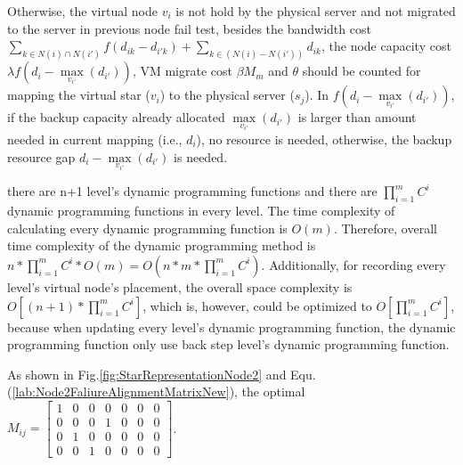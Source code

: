 Otherwise, the virtual node $v_i$ is not hold by the physical server and not migrated to the server in previous node fail test, besides the bandwidth cost ${\sum\limits_{k \in N(i) \cap N(i')} {f({d_{ik}} - {d_{i'k}})}  + \sum\limits_{k \in \left( {N(i) - N(i')} \right)} {{d_{ik}}} }$, the node capacity cost ${\lambda f({d_i} - \mathop {\max }\limits_{{v_{i'}}} \left( {{d_{i'}}} \right))}$, VM migrate cost ${\beta {M_m}}$ and $\theta$ should be counted for mapping the virtual star ($v_i$) to the physical server ($s_j$). In ${f({d_i} - \mathop {\max }\limits_{{v_{i'}}} \left( {{d_{i'}}} \right))}$, if the backup capacity already allocated ${\mathop {\max }\limits_{{v_{i'}}} \left( {{d_{i'}}} \right)}$ is larger than amount needed  in current mapping (i.e., $d_i$), no resource is needed, otherwise, the backup resource gap ${{d_i} - \mathop {\max }\limits_{{v_{i'}}} \left( {{d_{i'}}} \right)}$ is needed.

there are n+1 level's dynamic programming functions and there are $\prod_{i=1}^{m}C^i$ dynamic programming functions in every level. The time complexity of calculating every dynamic programming function is $O(m)$. Therefore, overall time complexity of the dynamic programming method is $n*\prod_{i=1}^{m}C^i*O(m)=O(n*m*\prod_{i=1}^{m}C^i)$. Additionally, for recording every level's virtual node's placement, the overall space complexity is $O[(n+1)*\prod_{i=1}^{m}C^i]$, which is, however, could be optimized to $O[\prod_{i=1}^{m}C^i]$, because when updating every level's dynamic programming function, the dynamic programming function only use back step level's dynamic programming function.


 As shown in Fig.\ref{fig:StarRepresentationNode2} and Equ.(\ref{lab:Node2FaliureAlignmentMatrixNew}), the optimal $M_{ij}=\left[ {\begin{array}{*{20}{c}}
1&0&0&0&0&0&0\\
0&0&0&1&0&0&0\\
0&1&0&0&0&0&0\\
0&0&1&0&0&0&0
\end{array}} \right]$.
